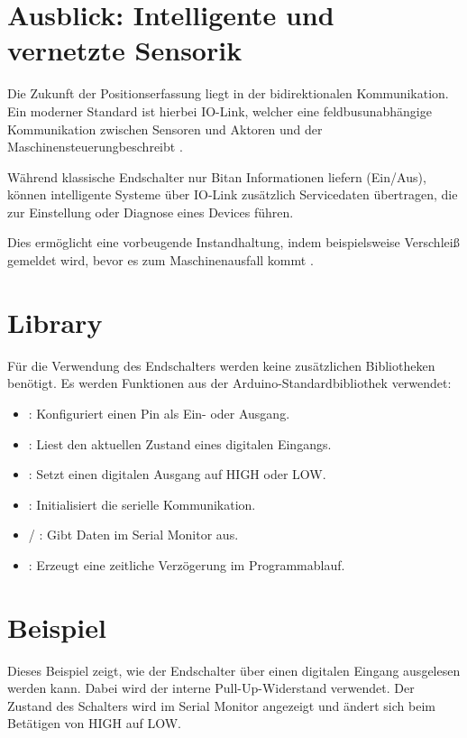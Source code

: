 \section{Ausblick: Intelligente und vernetzte Sensorik}

Die Zukunft der Positionserfassung liegt in der bidirektionalen Kommunikation. Ein moderner Standard ist hierbei IO-Link, welcher eine \glqq feldbusunabhängige Kommunikation zwischen Sensoren und Aktoren und der Maschinensteuerung\grqq{}beschreibt \cite[510]{Hering:2012}.

Während klassische Endschalter nur  Bit\grqq{}an Informationen liefern (Ein/Aus), können intelligente Systeme über IO-Link zusätzlich Servicedaten übertragen, \glqq die zur Einstellung oder Diagnose eines Devices führen\grqq{}\cite[512]{Hering:2012}.

Dies ermöglicht eine \glqq vorbeugende Instandhaltung\grqq{}, indem beispielsweise Verschleiß gemeldet wird, bevor es zum Maschinenausfall kommt \cite[471,512]{Hering:2012}.

\section{Library}

Für die Verwendung des Endschalters werden keine zusätzlichen Bibliotheken benötigt. 
Es werden Funktionen aus der Arduino-Standardbibliothek verwendet:


\begin{itemize}
	\item {}: Konfiguriert einen Pin als Ein- oder Ausgang.
	\item {}: Liest den aktuellen Zustand eines digitalen Eingangs.
	\item {}: Setzt einen digitalen Ausgang auf HIGH oder LOW.
	\item {}: Initialisiert die serielle Kommunikation.
	\item {} / : Gibt Daten im Serial Monitor aus.
	\item {}: Erzeugt eine zeitliche Verzögerung im Programmablauf.
\end{itemize}

\section{Beispiel}

Dieses Beispiel zeigt, wie der Endschalter über einen digitalen Eingang
ausgelesen werden kann. Dabei wird der interne Pull-Up-Widerstand verwendet.
Der Zustand des Schalters wird im Serial Monitor angezeigt und ändert sich beim Betätigen von HIGH auf LOW.


